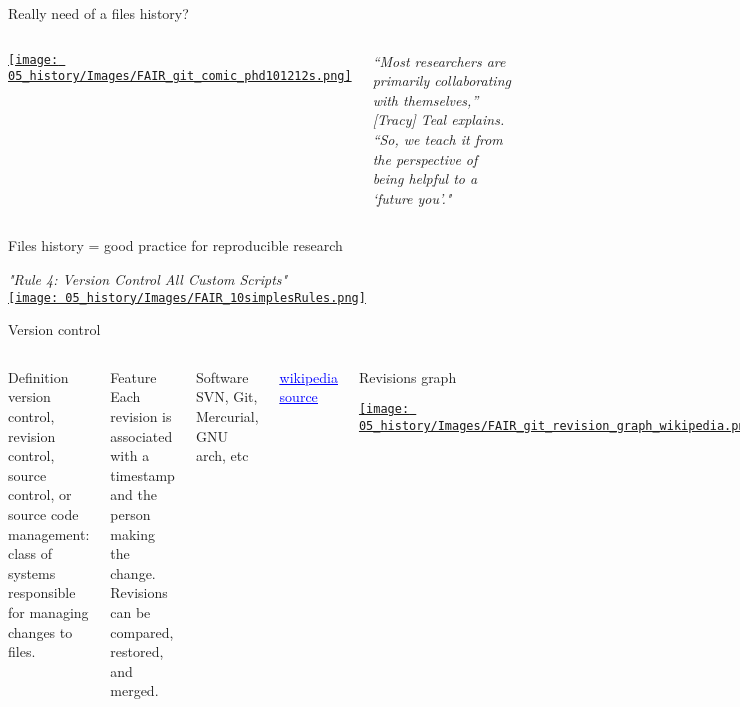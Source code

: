 \begin{frame}{Really need of a files history?}
\begin{columns}
  \begin{center}
        \href{http://phdcomics.com/comics/archive.php?comicid=1531}{\texttt{[image: 05\_history/Images/FAIR\_git\_comic\_phd101212s.png]}}
  \end{center}
  \begin{center}
     \textit{“Most researchers are primarily collaborating with themselves,” [Tracy] Teal explains. “So, we teach it from the perspective of being helpful to a ‘future you’." }
   \end{center}
\end{columns}
\end{frame}
\begin{frame}{Files history = good practice for reproducible research}
\begin{center}
    \textit{"Rule 4: Version Control All Custom Scripts"}\\
    \href{https://journals.plos.org/ploscompbiol/article?id=10.1371/journal.pcbi.1003285}{\texttt{[image: 05\_history/Images/FAIR\_10simplesRules.png]}}
\end{center}
\end{frame}
\begin{frame}{Version control}
\begin{columns}
   \begin{block}{Definition}
version control, revision control, source control, or source code management: class of systems responsible for managing changes to files.
   \end{block}
   \begin{block}{Feature}
Each revision is associated with a timestamp and the person making the change. \\
Revisions can be compared, restored, and merged.
   \end{block}
   \begin{block}{Software}
   SVN, Git, Mercurial, GNU arch, etc
   \end{block}
   \href{https://en.wikipedia.org/wiki/Version_control}{\textcolor{blue}{\underline{wikipedia source}}}
   \begin{block}{Revisions graph}
   \begin{center}
      \href{https://en.wikipedia.org/wiki/File:Revision_controlled_project_visualization-2010-24-02.svg}{\texttt{[image: 05\_history/Images/FAIR\_git\_revision\_graph\_wikipedia.png]}}
   \end{center}
   \end{block}
\end{columns}
\end{frame}
